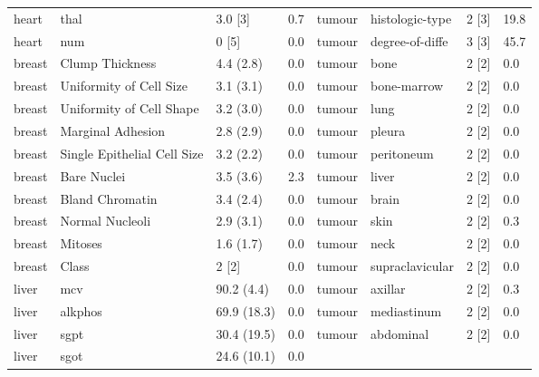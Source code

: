 \begin{small}
\begin{table}[htpb]
\begin{tabularx}{\textwidth}{lXll|lXll}
            heart   & thal                           & 3.0 {[}3{]}  & 0.7      & tumour   & histologic-type & 2 {[}3{]}    & 19.8     \\
            heart   & num                            & 0 {[}5{]}    & 0.0      & tumour   & degree-of-diffe & 3 {[}3{]}    & 45.7     \\
            breast  & Clump Thickness               & 4.4 (2.8)    & 0.0      & tumour   & bone            & 2 {[}2{]}    & 0.0      \\
            breast  & Uniformity of Cell Size     & 3.1 (3.1)    & 0.0      & tumour   & bone-marrow     & 2 {[}2{]}    & 0.0      \\
            breast  & Uniformity of Cell Shape    & 3.2 (3.0)    & 0.0      & tumour   & lung            & 2 {[}2{]}    & 0.0      \\
            breast  & Marginal Adhesion             & 2.8 (2.9)    & 0.0      & tumour   & pleura          & 2 {[}2{]}    & 0.0      \\
            breast  & Single Epithelial Cell Size & 3.2 (2.2)    & 0.0      & tumour   & peritoneum      & 2 {[}2{]}    & 0.0      \\
            breast  & Bare Nuclei                   & 3.5 (3.6)    & 2.3      & tumour   & liver           & 2 {[}2{]}    & 0.0      \\
            breast  & Bland Chromatin               & 3.4 (2.4)    & 0.0      & tumour   & brain           & 2 {[}2{]}    & 0.0      \\
            breast  & Normal Nucleoli               & 2.9 (3.1)    & 0.0      & tumour   & skin            & 2 {[}2{]}    & 0.3      \\
            breast  & Mitoses                        & 1.6 (1.7)    & 0.0      & tumour   & neck            & 2 {[}2{]}    & 0.0      \\
            breast  & Class                          & 2 {[}2{]}    & 0.0      & tumour   & supraclavicular & 2 {[}2{]}    & 0.0      \\
            liver   & mcv                            & 90.2 (4.4)   & 0.0      & tumour   & axillar         & 2 {[}2{]}    & 0.3      \\
            liver   & alkphos                        & 69.9 (18.3)  & 0.0      & tumour   & mediastinum     & 2 {[}2{]}    & 0.0      \\
            liver   & sgpt                           & 30.4 (19.5)  & 0.0      & tumour   & abdominal       & 2 {[}2{]}    & 0.0      \\
            liver   & sgot                           & 24.6 (10.1)  & 0.0      &         &                 &              &          \\
              \bottomrule
            \end{tabularx}

        \end{table}
    \end{small}


